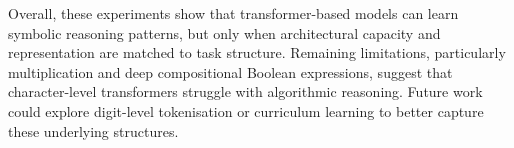 Overall, these experiments show that transformer-based models can learn symbolic reasoning patterns, but only when architectural capacity and representation are matched to task structure. Remaining limitations, particularly multiplication and deep compositional Boolean expressions, suggest that character-level transformers struggle with algorithmic reasoning. Future work could explore digit-level tokenisation or curriculum learning to better capture these underlying structures.

